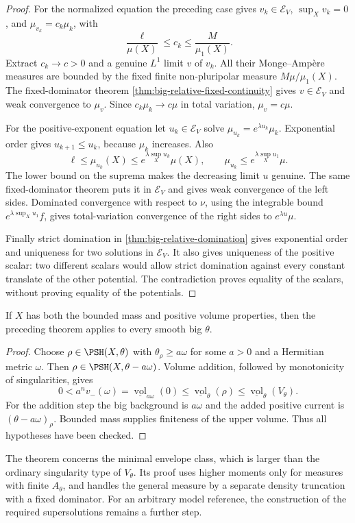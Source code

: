 \begin{proof}
For the normalized equation the preceding case gives $v_k\in\mathcal E_V$, $\sup_Xv_k=0$, and $\mu_{v_k}=c_k\mu_k$, with
\[
 \frac{\ell}{\mu(X)}\leq c_k\leq\frac M{\mu_1(X)}.
\]
Extract $c_k\to c>0$ and a genuine $L^1$ limit $v$ of $v_k$. All their Monge--Amp\`ere measures are bounded by the fixed finite non-pluripolar measure $M\mu/\mu_1(X)$. The fixed-dominator theorem \cref{thm:big-relative-fixed-continuity} gives $v\in\mathcal E_V$ and weak convergence to $\mu_v$. Since $c_k\mu_k\to c\mu$ in total variation, $\mu_v=c\mu$.

For the positive-exponent equation let $u_k\in\mathcal E_V$ solve $\mu_{u_k}=e^{\lambda u_k}\mu_k$. Exponential order gives $u_{k+1}\leq u_k$, because $\mu_k$ increases. Also
\[
 \ell\leq\mu_{u_k}(X)\leq e^{\lambda\sup_Xu_k}\mu(X),
 \qquad \mu_{u_k}\leq e^{\lambda\sup_Xu_1}\mu.
\]
The lower bound on the suprema makes the decreasing limit $u$ genuine. The same fixed-dominator theorem puts it in $\mathcal E_V$ and gives weak convergence of the left sides. Dominated convergence with respect to $\nu$, using the integrable bound $e^{\lambda\sup_Xu_1}f$, gives total-variation convergence of the right sides to $e^{\lambda u}\mu$.

Finally strict domination in \cref{thm:big-relative-domination} gives exponential order and uniqueness for two solutions in $\mathcal E_V$. It also gives uniqueness of the positive scalar: two different scalars would allow strict domination against every constant translate of the other potential. The contradiction proves equality of the scalars, without proving equality of the potentials.
\end{proof}

\begin{corollary}\label{cor:metric-pvp-minimal-volume}
If $X$ has both the bounded mass and positive volume properties, then the preceding theorem applies to every smooth big $\theta$.
\end{corollary}
\begin{proof}
Choose $\rho\in\PSH(X,\theta)$ with $\theta_\rho\geq a\omega$ for some $a>0$ and a Hermitian metric $\omega$. Then $\rho\in\PSH(X,\theta-a\omega)$. Volume addition, followed by monotonicity of singularities, gives
\[
 0<a^n v_-(\omega)
 =\underline{\operatorname{vol}}_{a\omega}(0)
 \leq\underline{\operatorname{vol}}_\theta(\rho)
 \leq\underline{\operatorname{vol}}_\theta(V_\theta).
\]
For the addition step the big background is $a\omega$ and the added positive current is $(\theta-a\omega)_\rho$. Bounded mass supplies finiteness of the upper volume. Thus all hypotheses have been checked.
\end{proof}

The theorem concerns the minimal envelope class, which is larger than the ordinary singularity type of $V_\theta$. Its proof uses higher moments only for measures with finite $A_\theta$, and handles the general measure by a separate density truncation with a fixed dominator. For an arbitrary model reference, the construction of the required supersolutions remains a further step.

